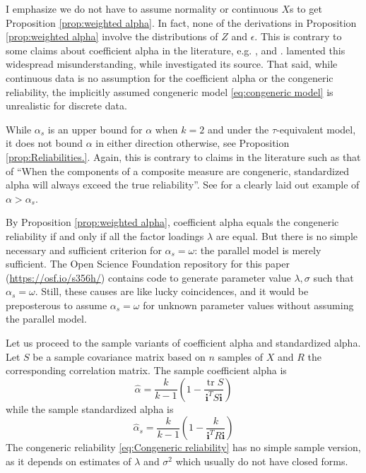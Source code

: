 \documentclass{article}
\theoremstyle{plain}
\theoremstyle{plain}
\theoremstyle{definition}
\theoremstyle{remark}
\theoremstyle{definition}
\theoremstyle{plain}
\theoremstyle{plain}
\theoremstyle{definition}
\DeclareMathOperator{\tr}{tr}
\begin{document}
I emphasize we do not have to assume normality or continuous $X$s to get Proposition \ref{prop:weighted alpha}. In fact, none of the derivations in Proposition \ref{prop:weighted alpha} involve the distributions of $Z$ and $\epsilon$. This is contrary to some claims about coefficient alpha in the literature, e.g. \citep[][p.415]{McNeish2018-vu}, \citep[][p.21]{Zumbo2007-ap} and \citep[][p. 1185]{Zumbo2019-lm}. \citet{Raykov2019-yr} lamented this widespread misunderstanding, while \citet[][p. 1060]{Chalmers2018-fj} investigated its source. That said, while continuous data is no assumption for the coefficient alpha or the congeneric reliability, the implicitly assumed congeneric model \eqref{eq:congeneric model} is unrealistic for discrete data. 

While $\alpha_s$ is an upper bound for $\alpha$ when $k = 2$ and under the $\tau$-equivalent model, it does not bound $\alpha$ in either direction otherwise, see Proposition \ref{prop:Reliabilities.}. Again, this is contrary to claims in the literature such as that of \citep[][p.348]{Osburn2000-jd} \enquote{When the components of a composite measure are congeneric, standardized alpha will always exceed the true reliability}. See \citep[][p.450]{Falk2011-ae} for a clearly laid out example of $\alpha>\alpha_s$.

By Proposition \ref{prop:weighted alpha}, coefficient alpha equals the congeneric reliability if and only if all the factor loadings $\lambda$ are equal. But there is no simple necessary and sufficient criterion for $\alpha_s = \omega$: the parallel model is merely sufficient. The Open Science Foundation repository for this paper (\url{https://osf.io/s356h/}) contains code to generate parameter value $\lambda,\sigma$ such that $\alpha_s = \omega$. Still, these causes are like lucky coincidences, and it would be preposterous to assume $\alpha_s = \omega$ for unknown parameter values without assuming the parallel model.

Let us proceed to the sample variants of coefficient alpha and standardized
alpha. Let $S$ be a sample covariance matrix based on
$n$ samples of $X$ and $R$ the corresponding correlation matrix.
The sample coefficient alpha is 
\begin{equation}
\hat{\alpha}=\frac{k}{k-1}\left(1-\frac{\tr{S}}{\mathbf{i}^{T}S\mathbf{i}}\right)\label{eq:sample coefficient alpha}
\end{equation}
while the sample standardized alpha is
\begin{equation}
\hat{\alpha}_s=\frac{k}{k-1}\left(1-\frac{k}{\mathbf{i}^{T}R\mathbf{i}}\right)\label{eq:sample standardized alpha}
\end{equation}
The congeneric reliability \eqref{eq:Congeneric reliability} has no
simple sample version, as it depends on estimates of $\lambda$ and
$\sigma^{2}$ which usually do not have closed forms.
\end{document}
